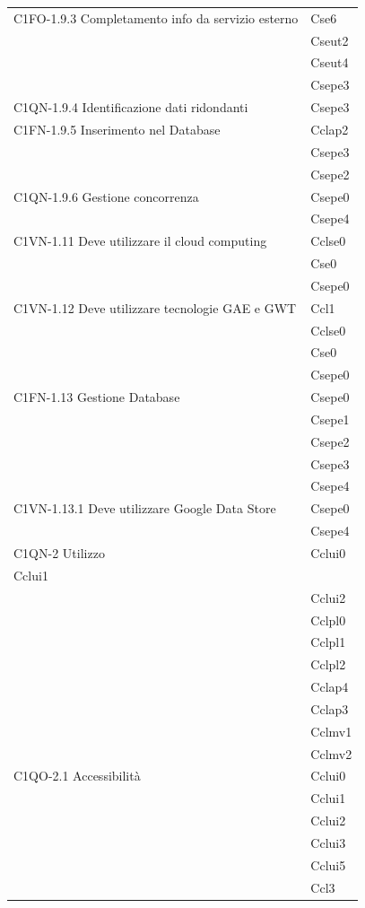 \begin{footnotesize}
\begin{longtable}[!h]{|l|l|}
C1FO-1.9.3 Completamento info da servizio esterno & Cse6\\
& Cseut2\\
& Cseut4\\
& Csepe3\\\hline  
C1QN-1.9.4 Identificazione dati ridondanti & Csepe3\\\hline                                                                                       
C1FN-1.9.5 Inserimento nel Database & Cclap2\\
& Csepe3\\
& Csepe2\\\hline  
C1QN-1.9.6 Gestione concorrenza & Csepe0\\
& Csepe4\\\hline    
C1VN-1.11 Deve utilizzare il cloud computing & Cclse0\\
& Cse0\\
& Csepe0\\\hline    
C1VN-1.12 Deve utilizzare tecnologie GAE e GWT & Ccl1\\
& Cclse0\\
& Cse0\\
& Csepe0\\\hline                                 
C1FN-1.13 Gestione Database & Csepe0\\
& Csepe1\\
& Csepe2\\
& Csepe3\\
& Csepe4\\\hline   
C1VN-1.13.1 Deve utilizzare Google Data Store & Csepe0\\
& Csepe4\\\hline      
C1QN-2 Utilizzo & Cclui0 \\
Cclui1\\
& Cclui2\\
& Cclpl0\\
& Cclpl1\\
& Cclpl2\\
& Cclap4\\
& Cclap3\\
& Cclmv1\\
& Cclmv2\\\hline  
C1QO-2.1 Accessibilit\`a & Cclui0\\
& Cclui1\\
& Cclui2\\
& Cclui3\\
& Cclui5\\
& Ccl3\\\hline 

\end{longtable}
\end{footnotesize}
